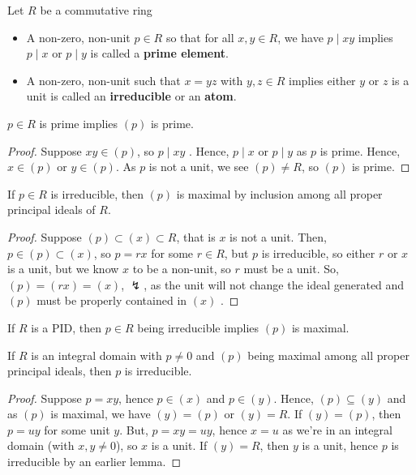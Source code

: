 \begin{definition}
Let \(R\) be a commutative ring
\begin{itemize}
	\item A non-zero, non-unit \(p \in R\) so that for all \(x, y \in R\), we have \(p \mid xy\) implies \(p \mid x\) or \(p \mid y\) is called a \textbf{prime element}.
	\item A non-zero, non-unit such that \(x = yz\) with \(y, z \in R\) implies either \(y\) or \(z\) is a unit is called an \textbf{irreducible} or an \textbf{atom}.
\end{itemize}
\end{definition}
\begin{proposition}
	\(p \in R\) is prime implies \(\left( p \right) \) is prime.
\end{proposition}
\begin{proof}
	Suppose \(xy \in \left( p \right) \), so \(p \mid xy\) . Hence, \(p \mid x\) or \(p \mid y\) as \(p\) is prime. Hence, \( x \in \left( p \right) \) or \(y \in \left( p \right) \). As \(p\) is not a unit, we see \(\left( p \right) \neq R\), so \(\left( p \right) \) is prime.
\end{proof}
\begin{proposition}
	If \(p \in R\) is irreducible, then \(\left( p \right) \) is maximal by inclusion among all proper principal ideals of \(R\).
\end{proposition}
\begin{proof}
	Suppose \(\left( p \right) \subset \left( x \right) \subset R\), that is \(x\) is not a unit. Then, \(p \in \left( p \right) \subset \left( x \right) \), so \(p = rx\) for some \(r \in R\), but \(p\) is irreducible, so either \(r\) or \(x\) is a unit, but we know \(x\) to be a non-unit, so \(r\) must be a unit. So, \(\left( p \right)  = \left( rx \right) = \left( x \right) \), \(\lightning\),  as the unit will not change the ideal generated and \(\left( p \right) \) must be properly contained in \(\left(x  \right) \) .
\end{proof}
\begin{corollary}
	If \(R\) is a PID, then \(p \in R\) being irreducible implies \(\left( p \right) \) is maximal.
\end{corollary}
\begin{proposition}
	If \(R\) is an integral domain with \(p \neq 0\) and \(\left( p \right) \) being maximal among all proper principal ideals, then \(p\) is irreducible.
\end{proposition}
\begin{proof}
	Suppose \( p = xy\), hence \(p \in \left( x \right) \) and \(p \in \left( y \right) \). Hence, \( \left( p \right) \subseteq \left( y \right) \) and as \(\left( p \right) \) is maximal, we have \(\left( y \right)  = \left( p \right) \) or \(\left( y \right)  = R\). If \(\left( y \right) = \left( p \right) \), then \( p = uy\) for some unit \(y\). But, \(p = xy = uy\), hence \(x = u\) as we're in an integral domain (with \(x, y \neq 0\)), so \(x\) is a unit. If \(\left( y \right)  = R\), then \(y\) is a unit, hence \(p\) is irreducible by an earlier lemma.
\end{proof}
